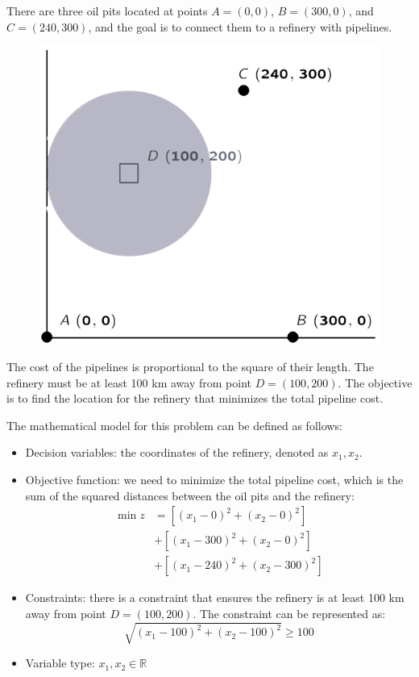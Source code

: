 \documentclass[12pt, a4paper]{report}
\begin{document}
    \begin{example}
        There are three oil pits located at points $A=(0,0)$, $B=(300,0)$, and $C=(240,300)$, and the goal is to connect them to a refinery with pipelines.
        \begin{figure}[H]
            \centering
            \includegraphics[width=0.4\linewidth]{images/example3.png}
        \end{figure}
        The cost of the pipelines is proportional to the square of their length.
        The refinery must be at least 100 km away from point $D=(100,200)$.
        The objective is to find the location for the refinery that minimizes the total pipeline cost.

        The mathematical model for this problem can be defined as follows:
        \begin{itemize}
            \item Decision variables: the coordinates of the refinery, denoted as $x_1,x_2$. 
            \item Objective function: we need to minimize the total pipeline cost, which is the sum of the squared distances between the oil pits and the refinery:
            \begin{align*}
                \min{z} &=\left[ (x_1-0)^2+(x_2-0)^2 \right] \\
                        &+ \left[ (x_1-300)^2+(x_2-0)^2 \right] \\
                        &+ \left[ (x_1-240)^2+(x_2-300)^2 \right] 
            \end{align*}
            \item Constraints: there is a constraint that ensures the refinery is at least 100 km away from point $D=(100,200)$. 
                The constraint can be represented as:
                \[\sqrt{{\left( x_1-100 \right)}^2+{\left( x_2-100 \right)}^2} \geq 100\]
            \item Variable type: $x_1,x_2 \in \mathbb{R}$
        \end{itemize}
    \end{example}
\end{document}
